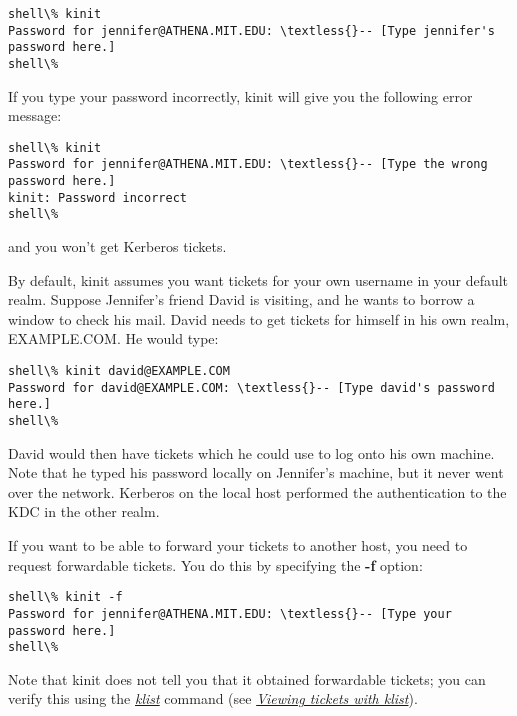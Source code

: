 \documentclass[letterpaper,10pt,english]{sphinxmanual}
\begin{document}
\begin{Verbatim}[commandchars=\\\{\}]
shell\% kinit
Password for jennifer@ATHENA.MIT.EDU: \textless{}-- [Type jennifer's password here.]
shell\%
\end{Verbatim}

If you type your password incorrectly, kinit will give you the
following error message:

\begin{Verbatim}[commandchars=\\\{\}]
shell\% kinit
Password for jennifer@ATHENA.MIT.EDU: \textless{}-- [Type the wrong password here.]
kinit: Password incorrect
shell\%
\end{Verbatim}

and you won't get Kerberos tickets.

By default, kinit assumes you want tickets for your own username in
your default realm.  Suppose Jennifer's friend David is visiting, and
he wants to borrow a window to check his mail.  David needs to get
tickets for himself in his own realm, EXAMPLE.COM.  He would type:

\begin{Verbatim}[commandchars=\\\{\}]
shell\% kinit david@EXAMPLE.COM
Password for david@EXAMPLE.COM: \textless{}-- [Type david's password here.]
shell\%
\end{Verbatim}

David would then have tickets which he could use to log onto his own
machine.  Note that he typed his password locally on Jennifer's
machine, but it never went over the network.  Kerberos on the local
host performed the authentication to the KDC in the other realm.

If you want to be able to forward your tickets to another host, you
need to request forwardable tickets.  You do this by specifying the
\textbf{-f} option:

\begin{Verbatim}[commandchars=\\\{\}]
shell\% kinit -f
Password for jennifer@ATHENA.MIT.EDU: \textless{}-- [Type your password here.]
shell\%
\end{Verbatim}

Note that kinit does not tell you that it obtained forwardable
tickets; you can verify this using the {\hyperref[user/user_commands/klist:klist-1]{\emph{klist}}} command (see
{\hyperref[user/tkt_mgmt:view-tkt]{\emph{Viewing tickets with klist}}}).
\end{document}
